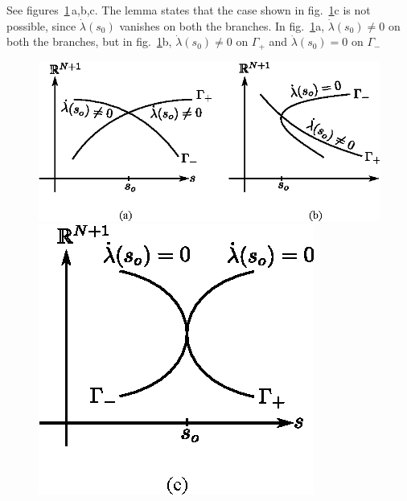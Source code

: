 See figures~\ref{chap5-fig5.4}\,a,b,c. The lemma states that the case shown in
fig.~\ref{chap5-fig5.4}c is not possible, since $\dot{\lambda}(s_{0})$
vanishes on 
both the branches. In fig.~\ref{chap5-fig5.4}a, $\dot{\lambda}(s_{0})
\neq 0 $ on 
both the branches, but in fig.~\ref{chap5-fig5.4}b,
$\dot{\lambda}(s_{0}) \neq 0$ on 
$\Gamma_{+}$ and $\dot{\lambda}(s_{0}) = 0$ on $\Gamma_{-}$ 

\begin{figure}[H]
\centering
\includegraphics{vol79-fig/fig79-28.eps}

\bigskip
\includegraphics{vol79-fig/fig79-28c.eps}
\caption{}
\label{chap5-fig5.4}
\end{figure}\pageoriginale


